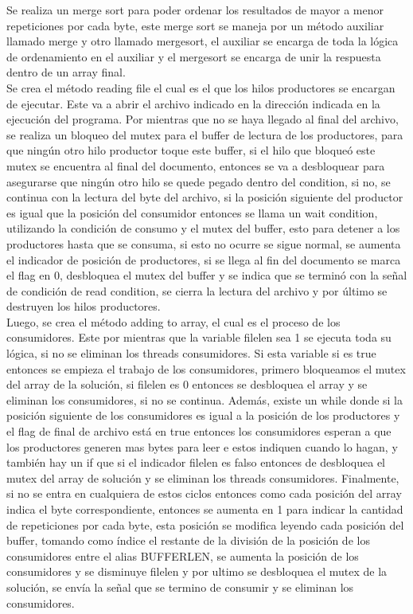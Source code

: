 \documentclass[10pt, article, natbib]{IEEEtran}
\begin{document}
Se realiza un merge sort para poder ordenar los resultados de mayor a menor repeticiones por cada byte, este merge sort se maneja por un método auxiliar llamado merge y otro llamado mergesort, el auxiliar se encarga de toda la lógica de ordenamiento en el auxiliar y el mergesort se encarga de unir la respuesta dentro de un array final.\\

Se crea el método reading file el cual es el que los hilos productores se encargan de ejecutar. Este va a abrir el archivo indicado en la dirección indicada en la ejecución del programa.\cite{chanilastnam_2015_c} \cite{cppreferencecom_2021_fread} \cite{kerrisk_2010_fseek3} Por mientras que no se haya llegado al final del archivo, se realiza un bloqueo del mutex para el buffer de lectura de los productores, para que ningún otro hilo productor toque este buffer, si el hilo que bloqueó este mutex se encuentra al final del documento, entonces se va a desbloquear para asegurarse que ningún otro hilo se quede pegado dentro del condition, si no, se continua con la lectura del byte del archivo, si la posición siguiente del productor es igual que la posición del consumidor entonces se llama un wait condition, utilizando la condición de consumo y el mutex del buffer, esto para detener a los productores hasta que se consuma, si esto no ocurre se sigue normal, se aumenta el indicador de posición de productores, si se llega al fin del documento se marca el flag en 0, desbloquea el mutex del buffer y se indica que se terminó con la señal de condición de read condition, se cierra la lectura del archivo y por último se destruyen los hilos productores.\cite{kerrisk_2010_pthread_exit3} \\

Luego, se crea el método adding to array, el cual es el proceso de los consumidores. Este por mientras que la variable filelen sea 1 se ejecuta toda su lógica, si no se eliminan los threads consumidores. Si esta variable si es true entonces se empieza el trabajo de los consumidores, primero bloqueamos el mutex del array de la solución, si filelen es 0 entonces se desbloquea el array y se eliminan los consumidores, si no se continua. Además, existe un while donde si la posición siguiente de los consumidores es igual a la posición de los productores y el flag de final de archivo está en true entonces los consumidores esperan a que los productores generen mas bytes para leer e estos indiquen cuando lo hagan, y también hay un if que si el indicador filelen es falso entonces de desbloquea el mutex del array de solución y se eliminan los threads consumidores. Finalmente, si no se entra en cualquiera de estos ciclos entonces como cada posición del array indica el byte correspondiente, entonces se aumenta en 1 para indicar la cantidad de repeticiones por cada byte, esta posición se modifica leyendo cada posición del buffer, tomando como índice el restante de la división de la posición de los consumidores entre el alias BUFFERLEN, se aumenta la posición de los consumidores y se disminuye filelen y por ultimo se desbloquea el mutex de la solución, se envía la señal que se termino de consumir y se eliminan los consumidores.\\
\end{document}
